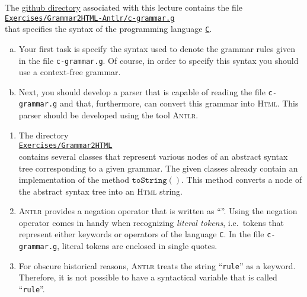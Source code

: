 \exerciseEng
The \href{https://github.com/karlstroetmann/Formal-Languages}{github directory} associated with this lecture
contains the file
\\[0.2cm]
\hspace*{1.3cm}
\href{https://github.com/karlstroetmann/Formal-Languages/tree/master/Exercises/Grammar2HTML-Antlr/c-grammar.g}{
\texttt{Exercises/Grammar2HTML-Antlr/c-grammar.g}}
\\[0.2cm]
that specifies the syntax of the programming language 
\href{https://en.wikipedia.org/wiki/C_(programming_language)}{\texttt{C}}.

\begin{enumerate}[(a)]
\item Your first task is specify the syntax used to denote the grammar rules given in the file
      \texttt{c-grammar.g}.  Of course, in order to specify this syntax you should use a
      context-free grammar. 
\item Next, you should develop a parser that is capable of reading the file \texttt{c-grammar.g}
      and that, furthermore, can convert this grammar into \textsc{Html}. 
      This parser should be developed using the tool \textsc{Antlr}.
\end{enumerate}

\remarkEng
\begin{enumerate}
\item The directory 
      \\[0.2cm]
      \hspace*{1.3cm}
      \href{https://github.com/karlstroetmann/Formal-Languages/tree/master/Exercises/Grammar2HTML/}{\texttt{Exercises/Grammar2HTML}}
      \\[0.2cm]
      contains several classes that represent various nodes of an abstract syntax tree corresponding to a
      given grammar.  The given classes already contain an implementation of the method $\texttt{toString}()$. This method 
      converts a node of the abstract syntax tree into an \textsc{Html} string.
\item \textsc{Antlr} provides a negation operator that is written as ``\texttt{}''.
      Using the negation operator comes in handy when recognizing \emph{literal tokens},  
      i.e.~tokens that represent either keywords or operators of the language \texttt{C}.  In the
      file \texttt{c-grammar.g}, literal tokens are enclosed in single quotes.
\item For obscure historical reasons, \textsc{Antlr} treats the string ``\texttt{rule}'' as a 
      keyword.  Therefore, it is not possible to have a syntactical variable that is called
      ``\texttt{rule}''. 
\end{enumerate}

